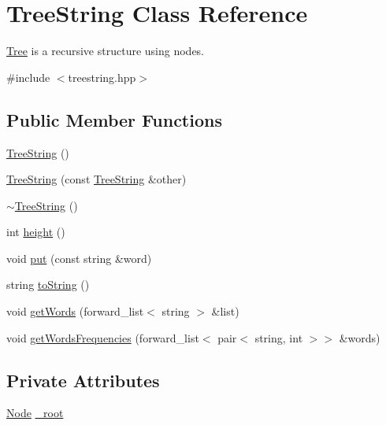 \hypertarget{class_tree_string}{\section{Tree\-String Class Reference}
\label{class_tree_string}
}


\hyperlink{class_tree}{Tree} is a recursive structure using nodes.  




{\ttfamily \#include $<$treestring.\-hpp$>$}

\subsection*{Public Member Functions}
\begin{DoxyCompactItemize}
\item 
\hyperlink{class_tree_string_a13117ec068109c174402c8f60597f243}{Tree\-String} ()
\item 
\hyperlink{class_tree_string_ae522f28db152cfe1376ca74f4d861fa7}{Tree\-String} (const \hyperlink{class_tree_string}{Tree\-String} \&other)
\item 
\hyperlink{class_tree_string_ad4672cc528918926c95098738924f3d2}{$\sim$\-Tree\-String} ()
\item 
int \hyperlink{class_tree_string_ac9ce25eae04196336cd8ac83ec5cb9b6}{height} ()
\item 
void \hyperlink{class_tree_string_ab61ae2b5bdba5d2d7d3a7f170a1d78e5}{put} (const string \&word)
\item 
string \hyperlink{class_tree_string_aed814ffed425fac5893e5a74f641977b}{to\-String} ()
\item 
void \hyperlink{class_tree_string_a51187eb2f3f6ec062a6709ce40b0234f}{get\-Words} (forward\-\_\-list$<$ string $>$ \&list)
\item 
void \hyperlink{class_tree_string_abbea8323b70edd4ac271de19317ac140}{get\-Words\-Frequencies} (forward\-\_\-list$<$ pair$<$ string, int $>$$>$ \&words)
\end{DoxyCompactItemize}
\subsection*{Private Attributes}
\begin{DoxyCompactItemize}
\item 
\hyperlink{class_node}{Node} \hyperlink{class_tree_string_a370851bf8faefb8655a188994715ed31}{\-\_\-root}
\end{DoxyCompactItemize}


